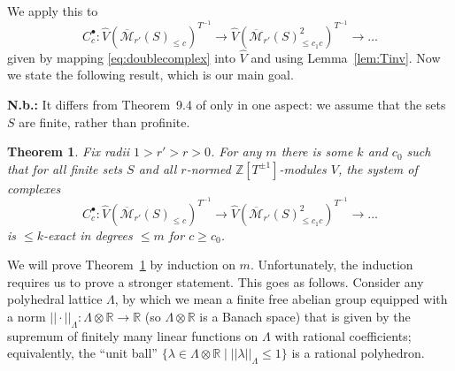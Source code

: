 \documentclass[11pt]{amsart}
\DeclareMathOperator{\Hom}{Hom}
\renewcommand*{\hat}{\widehat}
\numberwithin{equation}{section}
\newtheorem{theorem}{Theorem}
\numberwithin{theorem}{section}
\theoremstyle{definition}
\begin{document}
We apply this to
\[
C_c^\bullet: \widehat{V}(\overline{\mathcal M}_{r'}(S)_{\leq c})^{T^{-1}}\to \widehat{V}(\overline{\mathcal M}_{r'}(S)_{\leq c_1c}^2)^{T^{-1}}\to \ldots
\]
given by mapping \eqref{eq:doublecomplex} into $\hat{V}$ and using Lemma~\ref{lem:Tinv}.
Now we state the following result, which is our main goal.

\textbf{N.b.:}
It differs from Theorem~9.4 of \cite{Analytic} only in one aspect:
we assume that the sets $S$ are finite, rather than profinite.

\begin{theorem}\label{thm:explicit2}
	Fix radii $1>r'>r>0$. For any $m$ there is some $k$ and $c_0$ such that for all finite sets $S$ and all $r$-normed $\mathbb Z[T^{\pm 1}]$-modules $V$, the system of complexes
\[
C_c^\bullet: \widehat{V}(\overline{\mathcal M}_{r'}(S)_{\leq c})^{T^{-1}}\to \widehat{V}(\overline{\mathcal M}_{r'}(S)_{\leq c_1c}^2)^{T^{-1}}\to \ldots
\]
is $\leq k$-exact in degrees $\leq m$ for $c\geq c_0$.
\end{theorem}




We will prove Theorem~\ref{thm:explicit2} by induction on $m$. Unfortunately, the induction requires us to prove a stronger statement. This goes as follows. Consider any polyhedral lattice $\Lambda$, by which we mean a finite free abelian group equipped with a norm $||\cdot||_\Lambda: \Lambda\otimes \mathbb R\to \mathbb R$ (so $\Lambda\otimes \mathbb R$ is a Banach space) that is given by the supremum of finitely many linear functions on $\Lambda$ with rational coefficients; equivalently, the ``unit ball'' $\{\lambda\in \Lambda\otimes \mathbb R\mid ||\lambda||_\Lambda\leq 1\}$ is a rational polyhedron.
\end{document}
